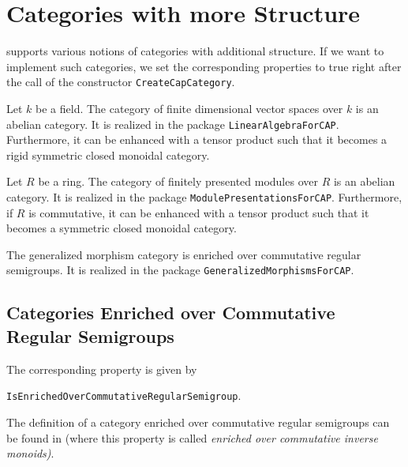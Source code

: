 \section{Categories with more Structure}

\CapPkg supports various notions of categories with additional structure.
If we want to implement such categories, we set the corresponding
\GAP properties to true right after the call of the constructor
\texttt{CreateCapCategory}.

\begin{example}
 Let $k$ be a field. The category of finite dimensional vector spaces over $k$
 is an abelian category. It is realized in the \CapPkg package \texttt{LinearAlgebraForCAP}.
 Furthermore, it can be enhanced with a tensor product such that it becomes a
 rigid symmetric closed monoidal category.
\end{example}

\begin{example}
 Let $R$ be a ring. The category of finitely presented modules over $R$
 is an abelian category. It is realized in the \CapPkg package \texttt{ModulePresentationsForCAP}.
 Furthermore, if $R$ is commutative, it can be enhanced with a tensor product such that it becomes a
 symmetric closed monoidal category.
\end{example}

\begin{example}
 The generalized morphism category is enriched over commutative regular semigroups.
 It is realized in the \CapPkg package \texttt{GeneralizedMorphismsForCAP}.
\end{example}

\subsection{Categories Enriched over Commutative Regular Semigroups}

\begin{documentation}
 The corresponding \GAP property is given by
 \begin{center}
  \texttt{IsEnrichedOverCommutativeRegularSemigroup}.  
 \end{center}
\end{documentation}

\begin{definition}
 The definition of a category enriched over commutative regular semigroups
 can be found in \cite{BL_GabrielMorphisms} (where this property is called
 \textit{enriched over commutative inverse monoids)}.
\end{definition}




